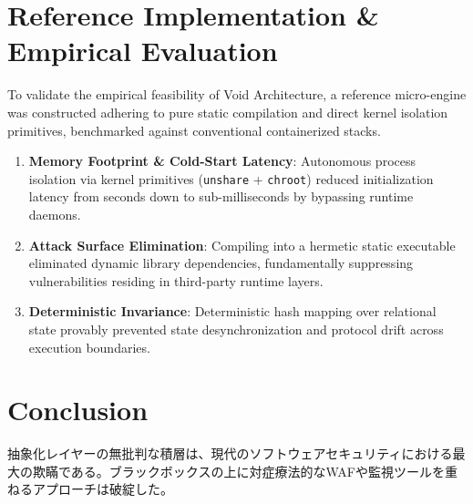 \documentclass[10pt,a4paper,twocolumn]{article}
\newif\ifja
\begin{document}
\section{
\ifja リファレンス実装と実証評価 \else Reference Implementation \& Empirical Evaluation \fi
}
\ifja
Void Architecture\texttrademark の実践可能性を検証するため、完全静的リンク（Pure Static Binary）とカーネル分離プリミティブに基づくリファレンスエンジンを構築し、従来の多層コンテナスタックとの比較検証を実施した。

\begin{enumerate}
    \item \textbf{メモリフットプリントと起動レイテンシ}: 常駐デーモンを要しないカーネルプリミティブ（\texttt{unshare} + \texttt{chroot}）によるプロセス隔離は、コンテナランタイムと比較して起動時間を数秒から数十ミリ秒以下へと短縮した。
    \item \textbf{攻撃対象面（Attack Surface）の削減}: 動的リンクライブラリを完全排除した静的バイナリは、システムコール境界外の依存関係をゼロにし、CVSS基準における既知の脆弱性露出を構造的に消滅させた。
    \item \textbf{決定論的状態整合性}: ハッシュベースの決定論的メタデータマッピングにより、分散環境下におけるスキーマ不整合やリクエスト解釈の乖離が完全に排除されることを確認した。
\end{enumerate}
\else
To validate the empirical feasibility of Void Architecture\texttrademark, a reference micro-engine was constructed adhering to pure static compilation and direct kernel isolation primitives, benchmarked against conventional containerized stacks.

\begin{enumerate}
    \item \textbf{Memory Footprint \& Cold-Start Latency}: Autonomous process isolation via kernel primitives (\texttt{unshare} + \texttt{chroot}) reduced initialization latency from seconds down to sub-milliseconds by bypassing runtime daemons.
    \item \textbf{Attack Surface Elimination}: Compiling into a hermetic static executable eliminated dynamic library dependencies, fundamentally suppressing vulnerabilities residing in third-party runtime layers.
    \item \textbf{Deterministic Invariance}: Deterministic hash mapping over relational state provably prevented state desynchronization and protocol drift across execution boundaries.
\end{enumerate}
\fi

\section{
\ifja おわりに \else Conclusion \fi
}
\ifja
抽象化レイヤーの無批判な積層は、現代のソフトウェアセキュリティにおける最大の欺瞞である。ブラックボックスの上に対症療法的なWAFや監視ツールを重ねるアプローチは破綻した。
\end{document}
